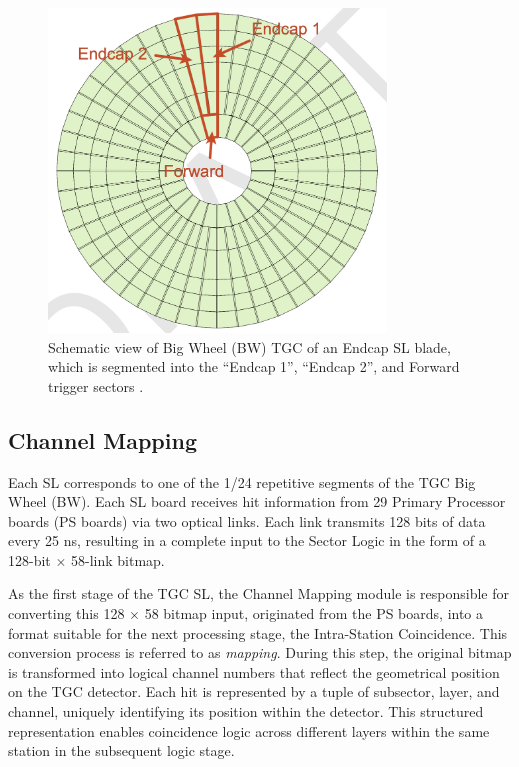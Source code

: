 \begin{figure}[htbp]
  \centering
  \includegraphics[width=0.8\textwidth]{figs/chapter5/endcap_and_forward_region.png}
  \caption{Schematic view of Big Wheel (BW) TGC of an Endcap SL blade, which is segmented into the ``Endcap 1'', ``Endcap 2'', and Forward trigger sectors \cite{EndcapSLPDR}.}
  \label{fig:endcapAndForward}
\end{figure}

\subsection{Channel Mapping} \label{subsec:ChannelMapping}
Each SL corresponds to one of the 1/24 repetitive segments of the TGC Big Wheel (BW). Each SL board receives hit information from 29 Primary Processor boards (PS boards) via two optical links. Each link transmits 128 bits of data every 25 ns, resulting in a complete input to the Sector Logic in the form of a 128-bit $\times$ 58-link bitmap.

As the first stage of the TGC SL, the Channel Mapping module is responsible for converting this 128 $\times$ 58 bitmap input, originated from the PS boards, into a format suitable for the next processing stage, the Intra-Station Coincidence. This conversion process is referred to as \textit{mapping}. During this step, the original bitmap is transformed into logical channel numbers that reflect the geometrical position on the TGC detector. Each hit is represented by a tuple of subsector, layer, and channel, uniquely identifying its position within the detector. This structured representation enables coincidence logic across different layers within the same station in the subsequent logic stage.
